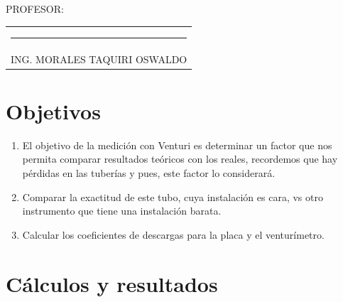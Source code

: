 \documentclass[a4paper,12pt]{report}
\begin{document}
{\large PROFESOR:} \\[0.6cm]
\begin{center}
\begin{tabular}{c}
\rule[3pt]{4.8in}{1pt}\\[1pt]
ING. MORALES TAQUIRI OSWALDO
\end{tabular}
\end{center}
\vfill
\newpage
\tableofcontents
\newpage
{} %
\setcounter{page}{1}  %
\chapter{Objetivos}
\begin{enumerate}
\item El objetivo de la medición con Venturi es determinar un factor que nos permita comparar resultados teóricos con los reales, recordemos que hay pérdidas en las tuberías y pues, este factor lo considerará.
\item Comparar la exactitud de este tubo, cuya instalación es cara, vs otro instrumento que tiene una instalación barata. 
\item Calcular los coeficientes de descargas para la placa y el venturímetro.
\end{enumerate}
\chapter{Cálculos y resultados}
\end{document}
